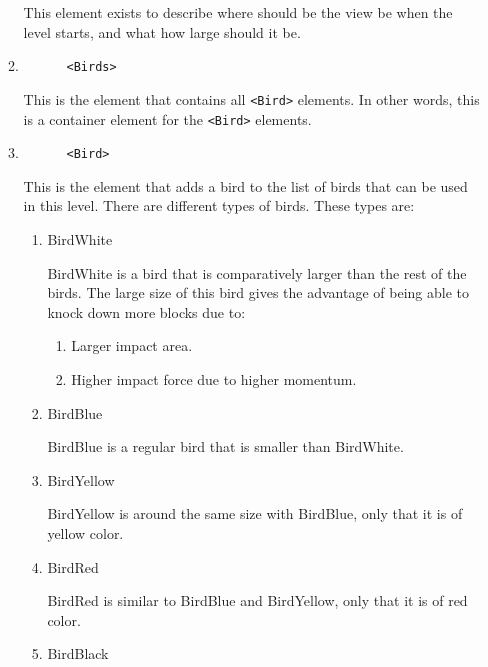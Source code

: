 \documentclass[12pt]{dalthesis}
\begin{document}
\begin{enumerate}
\begin{enumerate}
    This element exists to describe where should be the view be when the level starts, and what how large should it be.

    \item

    \begin{lstlisting}
      <Birds>
    \end{lstlisting}

    This is the element that contains all \lstinline{<Bird>} elements. In other words, this is a container element for the \lstinline{<Bird>} elements.

    \item

    \begin{lstlisting}
      <Bird>
    \end{lstlisting}

    This is the element that adds a bird to the list of birds that can be used in this level. There are different types of birds. These types are:

    \begin{enumerate}
      \item BirdWhite

      BirdWhite is a bird that is comparatively larger than the rest of the birds. The large size of this bird gives the advantage of being able to knock down more blocks due to:

      \begin{enumerate}
        \item Larger impact area.
        \item Higher impact force due to higher momentum.
      \end{enumerate}

      \item BirdBlue

      BirdBlue is a regular bird that is smaller than BirdWhite.

      \item BirdYellow

      BirdYellow is around the same size with BirdBlue, only that it is of yellow color.

      \item BirdRed

      BirdRed is similar to BirdBlue and BirdYellow, only that it is of red color.

      \item BirdBlack


\end{enumerate}
\end{enumerate}
\end{enumerate}
\end{document}
